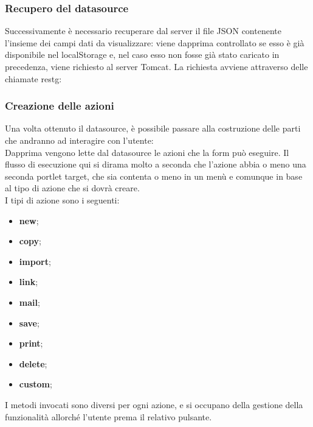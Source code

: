 \subsubsection{Recupero del datasource}
Successivamente è necessario recuperare dal server il file JSON contenente l'insieme dei campi dati da visualizzare: viene dapprima controllato se esso è già disponibile nel localStorage e, nel caso esso non fosse già stato caricato in precedenza, viene richiesto al server Tomcat.
La richiesta avviene attraverso delle chiamate \gls{restg}: %
\subsubsection{Creazione delle azioni}
Una volta ottenuto il datasource, è possibile passare alla costruzione delle parti che andranno ad interagire con l'utente:\\
Dapprima vengono lette dal datasource le azioni che la form può eseguire. Il flusso di esecuzione qui si dirama molto a seconda che l'azione abbia o meno una seconda \gls{portlet} target, che sia contenta o meno in un menù e comunque in base al tipo di azione che si dovrà creare.\\
I tipi di azione sono i seguenti:
\begin{itemize}
	\item \textbf{new};
	\item \textbf{copy};
	\item \textbf{import};
	\item \textbf{link};
	\item \textbf{mail};
	\item \textbf{save};
	\item \textbf{print};
	\item \textbf{delete};
	\item \textbf{custom};
\end{itemize}
I metodi invocati sono diversi per ogni azione, e si occupano della gestione della funzionalità allorché l'utente prema il relativo pulsante.
\newpage
